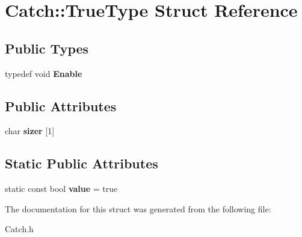 \hypertarget{struct_catch_1_1_true_type}{\section{Catch\-:\-:True\-Type Struct Reference}
\label{struct_catch_1_1_true_type}
}
\subsection*{Public Types}
\begin{DoxyCompactItemize}
\item 
\hypertarget{struct_catch_1_1_true_type_a1c370b2ef39036c053357b868ef94a97}{typedef void {\bfseries Enable}}\label{struct_catch_1_1_true_type_a1c370b2ef39036c053357b868ef94a97}

\end{DoxyCompactItemize}
\subsection*{Public Attributes}
\begin{DoxyCompactItemize}
\item 
\hypertarget{struct_catch_1_1_true_type_a8a7ed3be2e763d614e7d1f0cd18219d1}{char {\bfseries sizer} \mbox{[}1\mbox{]}}\label{struct_catch_1_1_true_type_a8a7ed3be2e763d614e7d1f0cd18219d1}

\end{DoxyCompactItemize}
\subsection*{Static Public Attributes}
\begin{DoxyCompactItemize}
\item 
\hypertarget{struct_catch_1_1_true_type_ac7b4114d6c6d3d4ff8d2df67f243d2be}{static const bool {\bfseries value} = true}\label{struct_catch_1_1_true_type_ac7b4114d6c6d3d4ff8d2df67f243d2be}

\end{DoxyCompactItemize}


The documentation for this struct was generated from the following file\-:\begin{DoxyCompactItemize}
\item 
Catch.\-h\end{DoxyCompactItemize}
